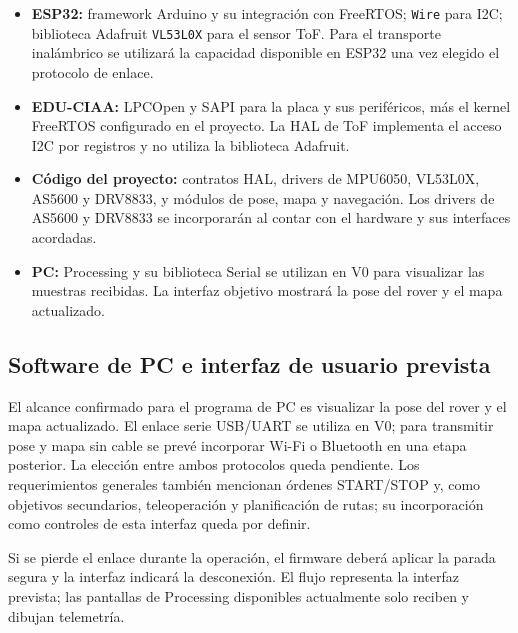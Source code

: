 \documentclass[11pt,a4paper]{article}
\begin{document}
\begin{itemize}
  \item \textbf{ESP32:} framework Arduino y su integración con FreeRTOS;
        \texttt{Wire} para I2C; biblioteca Adafruit \texttt{VL53L0X} para el
        sensor ToF. Para el transporte inalámbrico se utilizará la capacidad
        disponible en ESP32 una vez elegido el protocolo de enlace.
  \item \textbf{EDU-CIAA:} LPCOpen y SAPI para la placa y sus periféricos, más
        el kernel FreeRTOS configurado en el proyecto. La HAL de ToF implementa
        el acceso I2C por registros y no utiliza la biblioteca Adafruit.
  \item \textbf{Código del proyecto:} contratos HAL, drivers de MPU6050,
        VL53L0X, AS5600 y DRV8833, y módulos de pose, mapa y navegación. Los
        drivers de AS5600 y DRV8833 se incorporarán al contar con el hardware y
        sus interfaces acordadas.
  \item \textbf{PC:} Processing y su biblioteca Serial se utilizan en V0 para
        visualizar las muestras recibidas. La interfaz objetivo mostrará la
        pose del rover y el mapa actualizado.
\end{itemize}

\subsection{Software de PC e interfaz de usuario prevista}

El alcance confirmado para el programa de PC es visualizar la pose del rover y
el mapa actualizado. El enlace serie USB/UART se utiliza en V0; para transmitir
pose y mapa sin cable se prevé incorporar Wi-Fi o Bluetooth en una etapa
posterior. La elección entre ambos protocolos queda pendiente. Los
requerimientos generales también mencionan órdenes START/STOP y, como objetivos
secundarios, teleoperación y planificación de rutas; su incorporación como
controles de esta interfaz queda por definir.

\begin{center}
\end{center}

Si se pierde el enlace durante la operación, el firmware deberá aplicar la
parada segura y la interfaz indicará la desconexión. El flujo representa la
interfaz prevista; las pantallas de Processing disponibles actualmente solo
reciben y dibujan telemetría.
\end{document}
